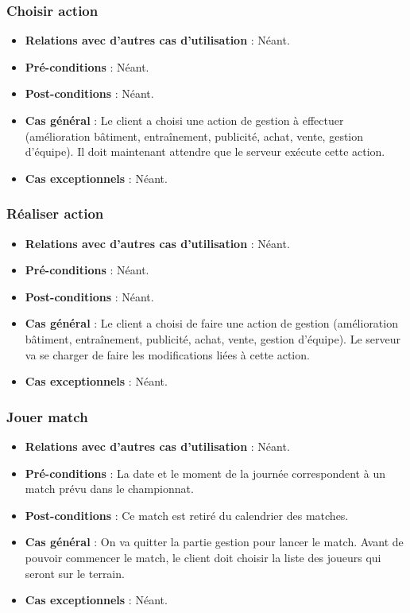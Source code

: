 \documentclass[a4paper,titlepage]{scrreprt}
\begin{document}
    \subsubsection{Choisir action}
      \begin{itemize}
        \item \textbf{Relations avec d'autres cas d'utilisation}  : Néant.
        \item \textbf{Pré-conditions} : Néant.
        \item \textbf{Post-conditions} : Néant.
        \item \textbf{Cas général} : Le client a choisi une action de gestion à effectuer (amélioration bâtiment, entraînement, publicité, achat, vente, gestion d’équipe). Il doit maintenant attendre que le serveur exécute cette action.
        \item \textbf{Cas exceptionnels} : Néant.
      \end{itemize}
    \subsubsection{Réaliser action}
      \begin{itemize}
        \item \textbf{Relations avec d'autres cas d'utilisation}  : Néant.
        \item \textbf{Pré-conditions} : Néant.
        \item \textbf{Post-conditions} : Néant.
        \item \textbf{Cas général} : Le client a choisi de faire une action de gestion (amélioration bâtiment, entraînement, publicité, achat, vente, gestion d’équipe). Le serveur va se charger de faire les modifications liées à cette action.
        \item \textbf{Cas exceptionnels} : Néant.
      \end{itemize}
    \subsubsection{Jouer match}
      \begin{itemize}
        \item \textbf{Relations avec d'autres cas d'utilisation}  : Néant.
        \item \textbf{Pré-conditions} : La date et le moment de la journée correspondent à un match prévu dans le championnat.
        \item \textbf{Post-conditions} : Ce match est retiré du \gls{calendrier} des matches.
        \item \textbf{Cas général} : On va quitter la partie gestion pour lancer le match. Avant de pouvoir commencer le match, le client doit choisir la liste des joueurs qui seront sur le terrain. 
        \item \textbf{Cas exceptionnels} : Néant.
      \end{itemize}
\end{document}
